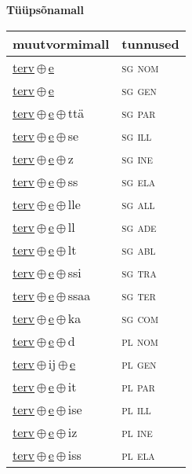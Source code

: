 

\vspace{3.5em}
\noindent \begin{minipage}{\textwidth}
\noindent \textbf{Tüüpsõnamall \,}\\

\begin{sideways}
\begin{tabular}{l l}
muutvormimall & tunnused \\
\hline
\underline{terv}\,$\oplus$\,\underline{e} & \textsc{ sg nom } \\
\underline{terv}\,$\oplus$\,\underline{e} & \textsc{ sg gen } \\
\underline{terv}\,$\oplus$\,\underline{e}\,$\oplus$\,ttä & \textsc{ sg par } \\
\underline{terv}\,$\oplus$\,\underline{e}\,$\oplus$\,se & \textsc{ sg ill } \\
\underline{terv}\,$\oplus$\,\underline{e}\,$\oplus$\,z & \textsc{ sg ine } \\
\underline{terv}\,$\oplus$\,\underline{e}\,$\oplus$\,ss & \textsc{ sg ela } \\
\underline{terv}\,$\oplus$\,\underline{e}\,$\oplus$\,lle & \textsc{ sg all } \\
\underline{terv}\,$\oplus$\,\underline{e}\,$\oplus$\,ll & \textsc{ sg ade } \\
\underline{terv}\,$\oplus$\,\underline{e}\,$\oplus$\,lt & \textsc{ sg abl } \\
\underline{terv}\,$\oplus$\,\underline{e}\,$\oplus$\,ssi & \textsc{ sg tra } \\
\underline{terv}\,$\oplus$\,\underline{e}\,$\oplus$\,ssaa & \textsc{ sg ter } \\
\underline{terv}\,$\oplus$\,\underline{e}\,$\oplus$\,ka & \textsc{ sg com } \\
\underline{terv}\,$\oplus$\,\underline{e}\,$\oplus$\,d & \textsc{ pl nom } \\
\underline{terv}\,$\oplus$\,ij\,$\oplus$\,\underline{e} & \textsc{ pl gen } \\
\underline{terv}\,$\oplus$\,\underline{e}\,$\oplus$\,it & \textsc{ pl par } \\
\underline{terv}\,$\oplus$\,\underline{e}\,$\oplus$\,ise & \textsc{ pl ill } \\
\underline{terv}\,$\oplus$\,\underline{e}\,$\oplus$\,iz & \textsc{ pl ine } \\
\underline{terv}\,$\oplus$\,\underline{e}\,$\oplus$\,iss & \textsc{ pl ela } \\

\end{tabular}
\end{sideways}
\end{minipage}
